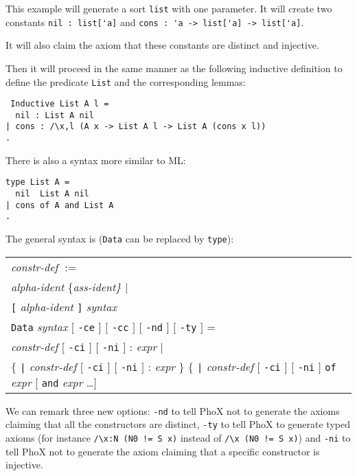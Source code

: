 This example will generate a sort \verb#list# with one parameter. It
will create two constants \verb#nil : list['a]# and
\verb#cons : 'a -> list['a] -> list['a]#.

It will also claim the axiom that these constants are distinct and injective.

Then it will proceed in the same manner as the following inductive
definition to define the predicate \verb#List# and the corresponding
lemmas:

\begin{verbatim}
 Inductive List A l =
  nil : List A nil
| cons : /\x,l (A x -> List A l -> List A (cons x l))
.
\end{verbatim}

There is also a syntax more similar to ML:

\begin{verbatim}
type List A =
  nil  List A nil
| cons of A and List A
.
\end{verbatim}

The general syntax is (\verb#Data# can be replaced by \verb#type#):

\begin{center}
\begin{tabular}{l}
{\it constr-def} $:=$ \\
\hspace{1cm} {\it alpha-ident} \{\it ass-ident\} $|$ \\ 
\hspace{1cm} \verb#[# {\it alpha-ident} \verb#]# {\it syntax} \\
\verb#Data# {\it syntax} $[$ \verb#-ce# $]$ $[$ \verb#-cc# $]$ $[$
\verb#-nd# $]$ $[$ \verb#-ty# $]$ = \\
\hspace{1cm} {\it constr-def}  $[$ \verb#-ci# $]$ $[$ \verb#-ni# $]$ :
{\it expr} $|$ \\
\hspace{1cm} $\{$ \verb#|#  {\it constr-def}  $[$ \verb#-ci# $]$  $[$
\verb#-ni# $]$ : {\it expr} $\}$
\hspace{1cm} $\{$ \verb#|#  {\it constr-def}  $[$ \verb#-ci# $]$  $[$
\verb#-ni# $]$ \verb#of# {\it expr} $[$ \verb#and# {\it expr} \dots $]$ \end{tabular}
\end{center}

We can remark three new options: \verb#-nd# to tell PhoX not to generate
the axioms claiming that all the constructors are distinct,
\verb#-ty# to tell PhoX to generate typed axioms (for instance
\verb#/\x:N (N0 != S x)# instead of \verb#/\x (N0 != S x)#) and
\verb#-ni# to tell PhoX not to generate
the axiom claiming that a specific constructor is injective.


